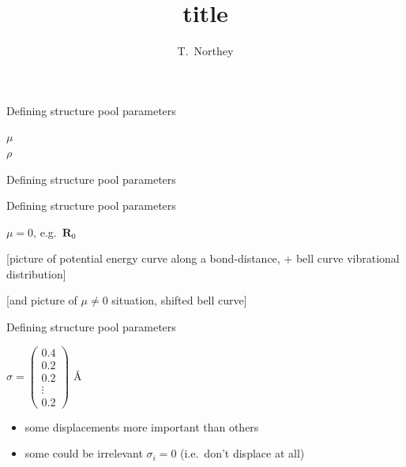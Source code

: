 \documentclass{beamer}
\title{title}
\author{T.\ Northey}
\begin{document}
\begin{frame}[plain]
    \maketitle
\end{frame}

\begin{frame}{Defining structure pool parameters}
\begin{center}
	{\huge$\mu$}\qquad{}\\
	\vspace{2cm}
	{\huge$\rho$}
\end{center}
\end{frame}

\begin{frame}{Defining structure pool parameters}
	\begin{center}

	\end{center}
\end{frame}

\begin{frame}{Defining structure pool parameters}
		\begin{center}
	{\huge$\mu=0$, e.g.\ $\textbf{R}_0$}
		\end{center}
	
	[picture of potential energy curve along a bond-distance, + bell curve vibrational distribution]
	
	[and picture of $\mu\neq 0$ situation, shifted bell curve]
\end{frame}

\begin{frame}{Defining structure pool parameters}
		\begin{center}
	$\sigma=\begin{pmatrix}
	0.4 \\
	0.2\\
	0.2\\
	\vdots\\
	0.2
	\end{pmatrix}
	$ \AA
		\end{center}
	
	\begin{itemize}
		\item some displacements more important than others
		\item some could be irrelevant $\sigma_i = 0$ (i.e.\ don't displace at all)
	\end{itemize}

\end{frame}
\end{document}
